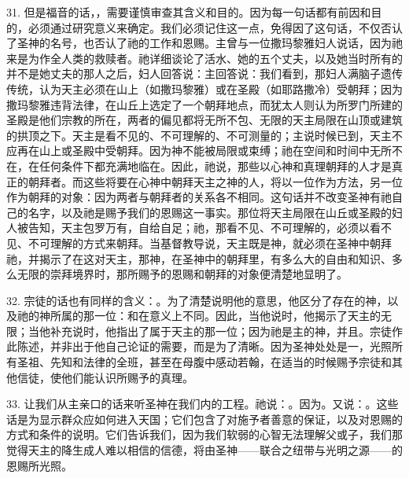 31. 但是福音的话，，需要谨慎审查其含义和目的。因为每一句话都有前因和目的，必须通过研究意义来确定。我们必须记住这一点，免得因了这句话，不仅否认了圣神的名号，也否认了祂的工作和恩赐。主曾与一位撒玛黎雅妇人说话，因为祂来是为作全人类的救赎者。祂详细谈论了活水、她的五个丈夫，以及她当时所有的并不是她丈夫的那人之后，妇人回答说：主回答说：我们看到，那妇人满脑子遗传传统，认为天主必须在山上（如撒玛黎雅）或在圣殿（如耶路撒冷）受朝拜；因为撒玛黎雅违背法律，在山丘上选定了一个朝拜地点，而犹太人则认为所罗门所建的圣殿是他们宗教的所在，两者的偏见都将无所不包、无限的天主局限在山顶或建筑的拱顶之下。天主是看不见的、不可理解的、不可测量的；主说时候已到，天主不应再在山上或圣殿中受朝拜。因为神不能被局限或束缚；祂在空间和时间中无所不在，在任何条件下都充满地临在。因此，祂说，那些以心神和真理朝拜的人才是真正的朝拜者。而这些将要在心神中朝拜天主之神的人，将以一位作为方法，另一位作为朝拜的对象：因为两者与朝拜者的关系各不相同。这句话并不改变圣神有祂自己的名字，以及祂是赐予我们的恩赐这一事实。那位将天主局限在山丘或圣殿的妇人被告知，天主包罗万有，自给自足；祂，那看不见、不可理解的，必须以看不见、不可理解的方式来朝拜。当基督教导说，天主既是神，就必须在圣神中朝拜祂，并揭示了在这对天主，那神，在圣神中的朝拜里，有多么大的自由和知识、多么无限的崇拜境界时，那所赐予的恩赐和朝拜的对象便清楚地显明了。\par

32. 宗徒的话也有同样的含义：。为了清楚说明他的意思，他区分了存在的神，以及祂的神所属的那一位：和在意义上不同。因此，当他说时，他揭示了天主的无限；当他补充说时，他指出了属于天主的那一位；因为祂是主的神，并且。宗徒作此陈述，并非出于他自己论证的需要，而是为了清晰。因为圣神处处是一，光照所有圣祖、先知和法律的全班，甚至在母腹中感动若翰，在适当的时候赐予宗徒和其他信徒，使他们能认识所赐予的真理。\par

33. 让我们从主亲口的话来听圣神在我们内的工程。祂说：。因为。又说：。这些话是为显示群众应如何进入天国；它们包含了对施予者善意的保证，以及对恩赐的方式和条件的说明。它们告诉我们，因为我们软弱的心智无法理解父或子，我们那觉得天主的降生成人难以相信的信德，将由圣神——联合之纽带与光明之源——的恩赐所光照。\par

